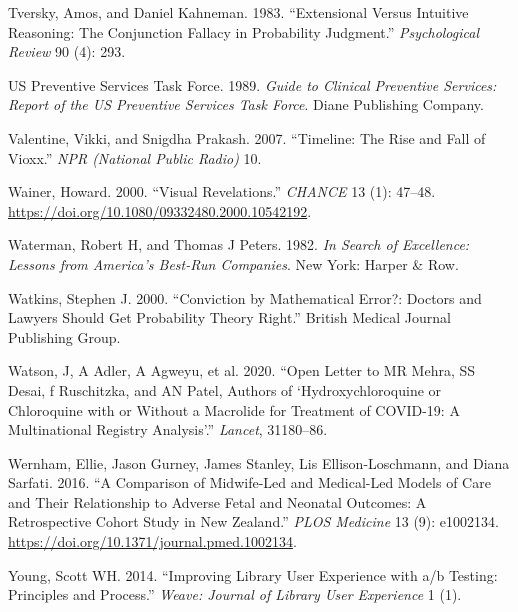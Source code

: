 \documentclass[
  10pt,
  b5paper]{book}
\newlength{\cslhangindent}
\newlength{\cslentryspacingunit} %
\newenvironment{CSLReferences}[2] %
 {%
  \setlength{\parindent}{0pt}
  \ifodd #1
  \let\oldpar\par
  \def\par{\hangindent=\cslhangindent\oldpar}
  \fi
  \setlength{\parskip}{#2\cslentryspacingunit}
 }%
 {}
\begin{document}
\begin{CSLReferences}{1}{0}
\leavevmode{}%
Tversky, Amos, and Daniel Kahneman. 1983. {``Extensional Versus Intuitive Reasoning: The Conjunction Fallacy in Probability Judgment.''} \emph{Psychological Review} 90 (4): 293.

\leavevmode{}%
US Preventive Services Task Force. 1989. \emph{Guide to Clinical Preventive Services: Report of the US Preventive Services Task Force}. Diane Publishing Company.

\leavevmode{}%
Valentine, Vikki, and Snigdha Prakash. 2007. {``Timeline: The Rise and Fall of Vioxx.''} \emph{NPR (National Public Radio)} 10.

\leavevmode{}%
Wainer, Howard. 2000. {``Visual Revelations.''} \emph{CHANCE} 13 (1): 47--48. \url{https://doi.org/10.1080/09332480.2000.10542192}.

\leavevmode{}%
Waterman, Robert H, and Thomas J Peters. 1982. \emph{In Search of Excellence: Lessons from America's Best-Run Companies}. New York: Harper \& Row.

\leavevmode{}%
Watkins, Stephen J. 2000. {``Conviction by Mathematical Error?: Doctors and Lawyers Should Get Probability Theory Right.''} British Medical Journal Publishing Group.

\leavevmode{}%
Watson, J, A Adler, A Agweyu, et al. 2020. {``Open Letter to MR Mehra, SS Desai, f Ruschitzka, and AN Patel, Authors of {`Hydroxychloroquine or Chloroquine with or Without a Macrolide for Treatment of COVID-19: A Multinational Registry Analysis'}.''} \emph{Lancet}, 31180--86.

\leavevmode{}%
Wernham, Ellie, Jason Gurney, James Stanley, Lis Ellison-Loschmann, and Diana Sarfati. 2016. {``A Comparison of Midwife-Led and Medical-Led Models of Care and Their Relationship to Adverse Fetal and Neonatal Outcomes: A Retrospective Cohort Study in New Zealand.''} \emph{PLOS Medicine} 13 (9): e1002134. \url{https://doi.org/10.1371/journal.pmed.1002134}.

\leavevmode{}%
Young, Scott WH. 2014. {``Improving Library User Experience with a/b Testing: Principles and Process.''} \emph{Weave: Journal of Library User Experience} 1 (1).

\end{CSLReferences}
\end{document}
